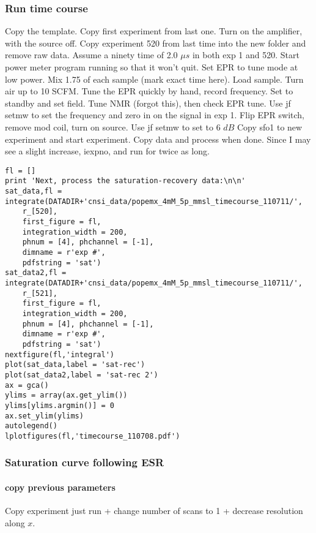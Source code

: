 \subsubsection{Run time course} Copy the template.   Copy first experiment from last one.   Turn on the amplifier, with the source off.  Copy experiment 520 from last time into the new folder and remove raw data.  Assume a ninety time of 2.0 $\mu s$ in both exp 1 and 520.  Start power meter program running so that it won't quit.  Set EPR to tune mode at low power.  Mix 1.75 of each sample (mark exact time here).  Load sample.  Turn air up to 10 SCFM.  Tune the EPR quickly by hand, record frequency.  Set to standby and set field.  Tune NMR (forgot this), then check EPR tune.  Use jf setmw to set the frequency and zero in on the signal in exp 1.  Flip EPR switch, remove mod coil, turn on source.  Use jf setmw to set to 6 $dB$ Copy sfo1 to new experiment and start experiment.  Copy data and process when done.   Since I may see a slight increase, iexpno, and run for twice as long.  
\begin{tiny}
\begin{lstlisting}
fl = []
print 'Next, process the saturation-recovery data:\n\n'
sat_data,fl = integrate(DATADIR+'cnsi_data/popemx_4mM_5p_mmsl_timecourse_110711/',
    r_[520],
    first_figure = fl,
    integration_width = 200,
    phnum = [4], phchannel = [-1],
    dimname = r'exp #',
    pdfstring = 'sat')
sat_data2,fl = integrate(DATADIR+'cnsi_data/popemx_4mM_5p_mmsl_timecourse_110711/',
    r_[521],
    first_figure = fl,
    integration_width = 200,
    phnum = [4], phchannel = [-1],
    dimname = r'exp #',
    pdfstring = 'sat')
nextfigure(fl,'integral')
plot(sat_data,label = 'sat-rec')
plot(sat_data2,label = 'sat-rec 2')
ax = gca()
ylims = array(ax.get_ylim())
ylims[ylims.argmin()] = 0
ax.set_ylim(ylims)
autolegend()
lplotfigures(fl,'timecourse_110708.pdf')
\end{lstlisting}
\end{tiny}

\subsubsection{Saturation curve following ESR}
\paragraph{copy previous parameters}
Copy experiment just run + change number of scans to 1 + decrease resolution along $x$.

